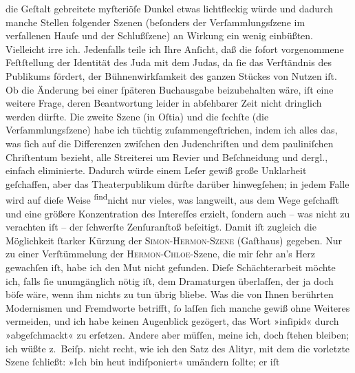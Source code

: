 \begin{ledgroupsized}[t]{13cm}
               die Geſtalt gebreitete myſteriöſe Dunkel etwas lichtfleckig würde und  dadurch manche Stellen folgender Szenen (beſonders
               der Verſammlungsſzene im verfallenen Hauſe und der Schlußſzene) {\pb}an Wirkung ein wenig einbüßten. Vielleicht
               irre ich. Jedenfalls teile ich Ihre Anſicht, daß die ſofort vorgenommene Feſtſtellung
               der Identität des Juda mit dem Judas, da ſie das Verſtändnis des Publikums fördert,
               der Bühnenwirkſamkeit des ganzen Stückes von Nutzen iſt. Ob die Änderung bei einer
               ſpäteren Buchausgabe beizubehalten wäre, iſt eine weitere Frage, deren Beantwortung
               leider in abſehbarer Zeit nicht dringlich werden dürfte.\pend
           \pstart
           Die zweite Szene (in Oſtia) und die ſechſte (die
               Verſammlungsſzene) habe ich tüchtig zuſammengeſtrichen, indem ich alles das, was ſich
               auf die Differenzen zwiſchen den Judenchriſten und dem pauliniſchen Chriſtentum
               bezieht, alle Streiterei um Revier und Beſchneidung und dergl., einfach eliminierte.
               Dadurch würde einem Leſer gewiß große Unklarheit geſchaffen, aber das Theaterpublikum
               dürfte darüber hinwegſehen; in jedem Falle wird auf dieſe Weise \substVorne{}\textsuperscript{ſind}\substDazwischen{}nicht\substHinten{} nur vieles, was langweilt, aus dem Wege geſchafft und eine größere
               Konzentration des Intereſſes erzielt, ſondern auch – {\pb}was nicht zu verachten iſt – der ſchwerſte
               Zenſuranſtoß beſeitigt. Damit iſt zugleich die Möglichkeit ſtarker Kürzung der \textsc{Simon-Hermon-Szene} (Gaſthaus) gegeben. Nur zu einer
               Verſtümmelung der \textsc{Hermon-Chloe}-Szene, die mir ſehr an’s
               Herz gewachſen iſt, habe ich den Mut nicht gefunden. Dieſe Schächterarbeit möchte
               ich, falls ſie unumgänglich nötig iſt, dem Dramaturgen überlaſſen, der ja doch böſe
               wäre, wenn ihm nichts zu tun übrig bliebe.\pend
           \pstart
           Was die von Ihnen berührten Modernismen und Fremdworte betrifft, ſo laſſen ſich
               manche gewiß ohne Weiteres vermeiden, und ich habe keinen Augenblick gezögert, das
               Wort »inſipid« durch »abgeſchmackt« zu erſetzen. Andere aber müſſen, meine ich, doch
               ſtehen bleiben; ich wüßte z. Beiſp. nicht recht, wie ich den Satz des Alityr, mit dem
               die vorletzte Szene ſchließt: »Ich bin heut indiſponiert« umändern ſollte; er iſt

\end{ledgroupsized}
